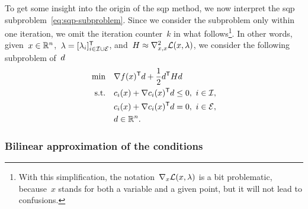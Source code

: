 To get some insight into the origin of the \gls{sqp} method, we now interpret the \gls{sqp} subproblem~\cref{eq:sqp-subproblem}.
Since we consider the subproblem only within one iteration, we omit the iteration counter~$k$ in what follows\footnote{With this simplification, the notation~$\nabla_x \lag(\iter, \lm)$ is a bit problematic, because~$x$ stands for both a variable and a given point, but it will not lead to confusions.}.
In other words, given~$\iter \in \R^n$,~$\lm = [\lm_i]_{i \in \iub \cup \ieq}^{\T}$, and~$H \approx \nabla_{x, x}^2 \lag(\iter, \lm)$, we consider the following subproblem of~$\step$
\begin{subequations}
    \label{eq:sqp-subproblem-nok}
    \begin{align}
        \min        & \quad \nabla \obj(\iter)^{\T} \step + \frac{1}{2} \step^{\T} H \step\\
        \text{s.t.} & \quad \con{i}(\iter) + \nabla \con{i}(\iter)^{\T} \step \le 0, ~ i \in \iub,\\
                    & \quad \con{i}(\iter) + \nabla \con{i}(\iter)^{\T} \step = 0, ~ i \in \ieq,\\
                    & \quad \step \in \R^n. \nonumber
    \end{align}
\end{subequations}

\subsubsection{Bilinear approximation of the  conditions}

